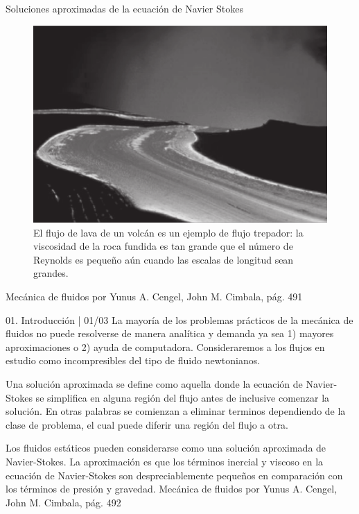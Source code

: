 \begin{frame}{Soluciones aproximadas de la ecuación de Navier Stokes}
\justifying

\begin{figure}[H]
\centering
\includegraphics[scale=0.2]{Section_Files/S3-imagenes-Jhon/0001.png}
\caption{El flujo de lava de un volcán es un ejemplo de flujo trepador: la viscosidad de la roca fundida es tan grande que el número de Reynolds es pequeño aún cuando las escalas de longitud sean grandes.}
\end{figure}

{\tiny Mecánica de fluidos por Yunus A. Cengel, John M. Cimbala, pág. 491}
\end{frame}

\begin{frame}{01. Introducción | 01/03}
\justifying
La mayoría de los problemas prácticos de la mecánica de fluidos no puede resolverse de manera analítica y demanda ya sea 1) mayores aproximaciones o 2) ayuda de computadora. Consideraremos a los flujos en estudio como incompresibles del tipo de fluido newtonianos.


Una solución aproximada se define como aquella donde la ecuación de Navier-Stokes se simplifica en alguna región del flujo antes de inclusive comenzar la solución. En otras palabras se comienzan a eliminar terminos dependiendo de la clase de problema, el cual puede diferir una región del flujo a otra.

Los fluidos estáticos pueden considerarse como una solución aproximada de Navier-Stokes. La aproximación es que los términos inercial y viscoso en la ecuación de Navier-Stokes son despreciablemente pequeños en comparación con los términos de presión y gravedad.
{\tiny Mecánica de fluidos por Yunus A. Cengel, John M. Cimbala, pág. 492}
\end{frame}

